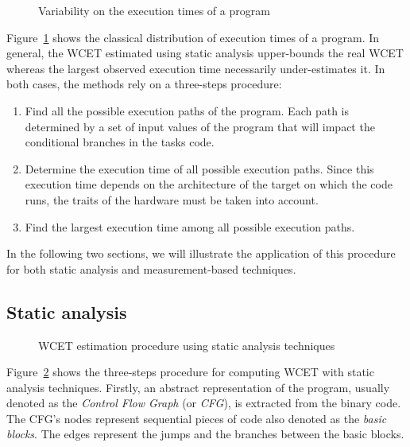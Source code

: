 \documentclass[main.tex]{subfiles}
\begin{document}
\begin{figure}
    \centering
    \scalebox{1.3}{}
    \caption{Variability on the execution times of a program }
    \label{fig_stateOfTheArt_WCET}
\end{figure}
Figure~\ref{fig_stateOfTheArt_WCET} shows the classical distribution of
execution times of a program. In general, the WCET estimated using static
analysis upper-bounds the real WCET whereas the largest observed execution time
necessarily under-estimates it. In both cases, the methods rely on a
three-steps procedure:
\begin{enumerate}
    \item Find all the possible execution paths of the program. Each path is
        determined by a set of input values of the program that will impact the
        conditional branches in the tasks code.
    \item Determine the execution time of all possible execution paths. Since
        this execution time depends on the architecture of the target on which
        the code runs, the traits of the hardware must be taken into account.
    \item Find the largest execution time among all possible execution paths.
\end{enumerate}

In the following two sections, we will illustrate the application of this
procedure for both static analysis and measurement-based techniques.


\subsection{Static analysis}

\begin{figure}
    \centering
    \scalebox{0.72}{}
    \caption{WCET estimation procedure using static analysis techniques}
    \label{fig_stateOfTheArt_StaticAnalysis}
\end{figure}

Figure~\ref{fig_stateOfTheArt_StaticAnalysis} shows the three-steps procedure
for computing WCET with static analysis techniques. Firstly, an abstract
representation of the program, usually denoted as the \emph{Control Flow Graph}
(or \emph{CFG}), is extracted from the binary code. The CFG's nodes represent
sequential pieces of code also denoted as the \emph{basic blocks}. The edges
represent the jumps and the branches between the basic blocks.
\end{document}
